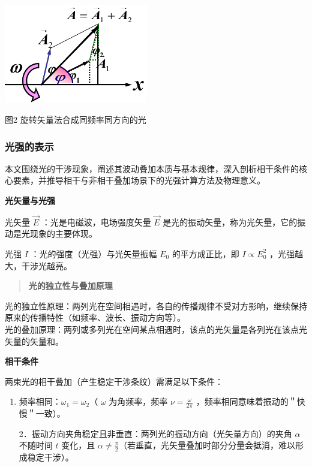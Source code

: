 \documentclass[
]{article}
\begin{document}
\includegraphics[width=2.45694in,height=1.70208in]{vertopal_72c3f5a01d1e42e3b032effc6533cf2c/media/image2.png}

图2 旋转矢量法合成同频率同方向的光

\hypertarget{ux5149ux5f3aux7684ux8868ux793a}{%
\subsubsection{光强的表示}\label{ux5149ux5f3aux7684ux8868ux793a}}

本文围绕光的干涉现象，阐述其波动叠加本质与基本规律，深入剖析相干条件的核心要素，并推导相干与非相干叠加场景下的光强计算方法及物理意义。

\textbf{光矢量与光强}

光矢量 \(\overrightarrow{E}\) ：光是电磁波，电场强度矢量
\(\overrightarrow{E}\)
是光的振动矢量，称为光矢量，它的振动是光现象的主要体现。

光强 \(I\) ：光的强度（光强）与光矢量振幅 \(E_{0}\) 的平方成正比，即
\(I \propto E_{0}^{2}\) ，光强越大，干涉光越亮。

\begin{quote}
\textbf{光的独立性与叠加原理}
\end{quote}

光的独立性原理：两列光在空间相遇时，各自的传播规律不受对方影响，继续保持原来的传播特性（如频率、波长、振动方向等）。\\
光的叠加原理：两列或多列光在空间某点相遇时，该点的光矢量是各列光在该点光矢量的矢量和。

\textbf{相干条件}

两束光的相干叠加（产生稳定干涉条纹）需满足以下条件：

\begin{enumerate}
\def\labelenumi{\arabic{enumi}.}
\item
  频率相同：\(\omega_{1} = \omega_{2}\)（ \(\omega\) 为角频率，频率
  \(\nu = \frac{\omega}{2\pi}\) ，频率相同意味着振动的＂快慢＂一致）。

  2．振动方向夹角稳定且非垂直：两列光的振动方向（光矢量方向）的夹角
  \(\alpha\) 不随时间 \(t\) 变化，且
  \(\alpha \neq \frac{\pi}{2}\)（若垂直，光矢量叠加时部分分量会抵消，难以形成稳定干涉）。
\end{enumerate}
\end{document}
